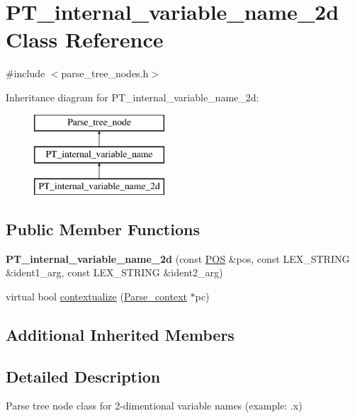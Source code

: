 \hypertarget{classPT__internal__variable__name__2d}{}\section{P\+T\+\_\+internal\+\_\+variable\+\_\+name\+\_\+2d Class Reference}
\label{classPT__internal__variable__name__2d}


{\ttfamily \#include $<$parse\+\_\+tree\+\_\+nodes.\+h$>$}

Inheritance diagram for P\+T\+\_\+internal\+\_\+variable\+\_\+name\+\_\+2d\+:\begin{figure}[H]
\begin{center}
\leavevmode
\includegraphics[height=3.000000cm]{classPT__internal__variable__name__2d}
\end{center}
\end{figure}
\subsection*{Public Member Functions}
\begin{DoxyCompactItemize}
\item 
\mbox{\label{classPT__internal__variable__name__2d_a4fe23bb813a0717e9002a173eb578701}} 
{\bfseries P\+T\+\_\+internal\+\_\+variable\+\_\+name\+\_\+2d} (const \mbox{\hyperlink{structYYLTYPE}{P\+OS}} \&pos, const L\+E\+X\+\_\+\+S\+T\+R\+I\+NG \&ident1\+\_\+arg, const L\+E\+X\+\_\+\+S\+T\+R\+I\+NG \&ident2\+\_\+arg)
\item 
virtual bool \mbox{\hyperlink{classPT__internal__variable__name__2d_a710255bf525ff2aca0c254c15a1882f6}{contextualize}} (\mbox{\hyperlink{structParse__context}{Parse\+\_\+context}} $\ast$pc)
\end{DoxyCompactItemize}
\subsection*{Additional Inherited Members}


\subsection{Detailed Description}
Parse tree node class for 2-\/dimentional variable names (example\+: .x) 

